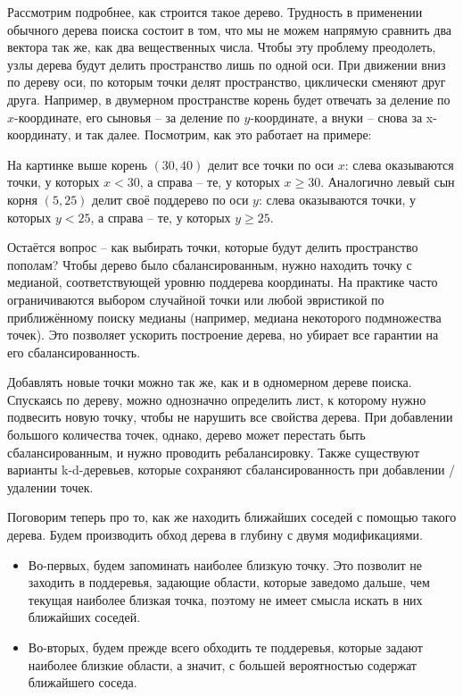 Рассмотрим подробнее, как строится такое дерево.
Трудность в применении обычного дерева поиска состоит в том, что мы не можем напрямую сравнить два вектора так же,
как два вещественных числа.
Чтобы эту проблему преодолеть, узлы дерева будут делить пространство лишь по одной оси.
При движении вниз по дереву оси, по которым точки делят пространство, циклически сменяют друг друга.
Например, в двумерном пространстве корень будет отвечать за деление по $x$-координате, его сыновья -- за деление
по $y$-координате, а внуки -- снова за x-координату, и так далее.
Посмотрим, как это работает на примере:

На картинке выше корень $(30, 40)$ делит все точки по оси $x$: слева оказываются точки, у которых $x < 30$,
а справа -- те, у которых $x \geq 30$.
Аналогично левый сын корня $(5,25)$ делит своё поддерево по оси $y$: слева оказываются точки, у которых $y<25$,
а справа -- те, у которых $y \geq 25$.

Остаётся вопрос -- как выбирать точки, которые будут делить пространство пополам?
Чтобы дерево было сбалансированным, нужно находить точку с медианой, соответствующей уровню поддерева координаты.
На практике часто ограничиваются выбором случайной точки или любой эвристикой по приближённому поиску медианы
(например, медиана некоторого подмножества точек).
Это позволяет ускорить построение дерева, но убирает все гарантии на его сбалансированность.

Добавлять новые точки можно так же, как и в одномерном дереве поиска.
Спускаясь по дереву, можно однозначно определить лист, к которому нужно подвесить новую точку, чтобы не нарушить все
свойства дерева.
При добавлении большого количества точек, однако, дерево может перестать быть сбалансированным, и нужно проводить
ребалансировку.
Также существуют варианты k-d-деревьев, которые сохраняют сбалансированность при добавлении / удалении точек.

Поговорим теперь про то, как же находить ближайших соседей с помощью такого дерева.
Будем производить обход дерева в глубину с двумя модификациями.

\begin{itemize}
    \item Во-первых, будем запоминать наиболее близкую точку.
    Это позволит не заходить в поддеревья, задающие области, которые заведомо дальше, чем текущая наиболее близкая
    точка, поэтому не имеет смысла искать в них ближайших соседей.
    \item Во-вторых, будем прежде всего обходить те поддеревья, которые задают наиболее близкие области, а значит, с
    большей вероятностью содержат ближайшего соседа.
\end{itemize}

